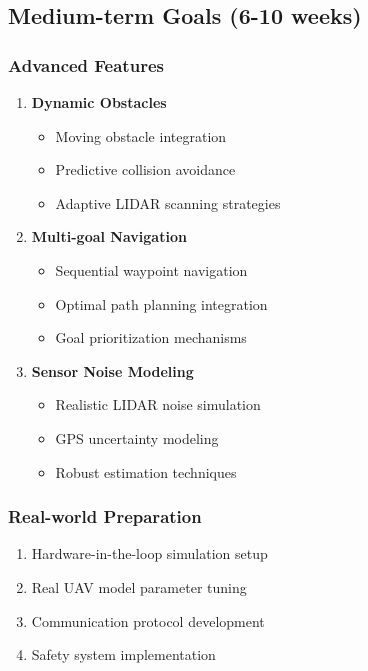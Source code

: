 \documentclass[12pt,a4paper]{article}
\begin{document}
\subsection{Medium-term Goals (6-10 weeks)}

\subsubsection{Advanced Features}
\begin{enumerate}
    \item \textbf{Dynamic Obstacles}
        \begin{itemize}
            \item Moving obstacle integration
            \item Predictive collision avoidance
            \item Adaptive LIDAR scanning strategies
        \end{itemize}
    
    \item \textbf{Multi-goal Navigation}
        \begin{itemize}
            \item Sequential waypoint navigation
            \item Optimal path planning integration
            \item Goal prioritization mechanisms
        \end{itemize}
    
    \item \textbf{Sensor Noise Modeling}
        \begin{itemize}
            \item Realistic LIDAR noise simulation
            \item GPS uncertainty modeling
            \item Robust estimation techniques
        \end{itemize}
\end{enumerate}

\subsubsection{Real-world Preparation}
\begin{enumerate}
    \item Hardware-in-the-loop simulation setup
    \item Real UAV model parameter tuning
    \item Communication protocol development
    \item Safety system implementation
\end{enumerate}
\end{document}
